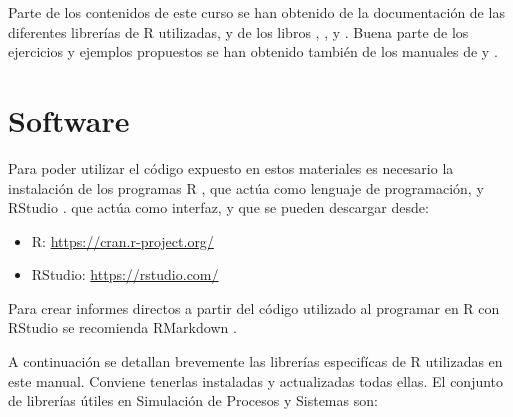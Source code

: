 \documentclass[
]{book}
\providecommand{\tightlist}{%
  \setlength{\itemsep}{0pt}\setlength{\parskip}{0pt}}
\theoremstyle{definition}
\theoremstyle{definition}
\theoremstyle{definition}
\theoremstyle{definition}
\theoremstyle{remark}
\begin{document}
Parte de los contenidos de este curso se han obtenido de la documentación de las diferentes librerías de R utilizadas, y de los libros \citet{MayMor2007}, \citet{FelmanValdez2010}, \citet{Kulkarni2011} y \citet{robertcasella2010}. Buena parte de los ejercicios y ejemplos propuestos se han obtenido también de los manuales de \citet{garcia-sabater2016} y \citet{cao2002}.

\hypertarget{software}{%
\chapter*{Software}\label{software}}

Para poder utilizar el código expuesto en estos materiales es necesario la instalación de los programas R \citep{R-base}, que actúa como lenguaje de programación, y RStudio \citep{rstudio}. que actúa como interfaz, y que se pueden descargar desde:

\begin{itemize}
\tightlist
\item
  R: \url{https://cran.r-project.org/}
\item
  RStudio: \url{https://rstudio.com/}
\end{itemize}

Para crear informes directos a partir del código utilizado al programar en R con RStudio se recomienda RMarkdown \citep{R-rmarkdown}.

A continuación se detallan brevemente las librerías especifícas de R utilizadas en este manual. Conviene tenerlas instaladas y actualizadas todas ellas. El conjunto de librerías útiles en Simulación de Procesos y Sistemas son:
\end{document}
